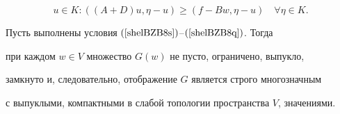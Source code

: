 \begin{equation}


u \in K : ((A+D)u, \eta-u)\geq (f- B w, \eta-u) \quad \forall 


\eta \in K.


\label{shelBZB8_01}


\end{equation}





\begin{lem} \label{BZ_Izv05_L4}


Пусть выполнены условия $(\ref{shelBZB8s})$--$(\ref{shelBZB8q})$. Тогда


при каждом $w \in V$ множество $G(w)$ не пусто, ограничено, выпукло,


замкнуто и, следовательно, отображение $G$ является строго многозначным


с выпуклыми, компактными в слабой топологии пространства $V$, значениями.


\end{lem}





